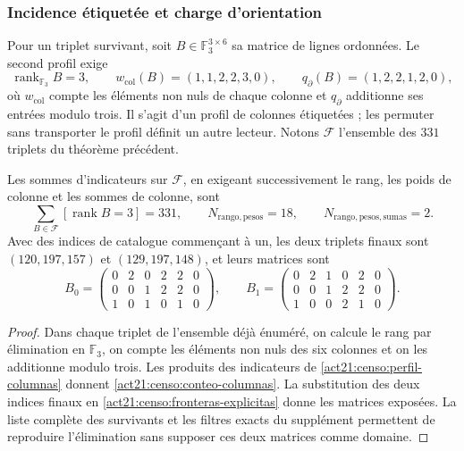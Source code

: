 \subsubsection{Incidence étiquetée et charge d'orientation}

Pour un triplet survivant, soit \(B\in\mathbb F_3^{3\times6}\) sa
matrice de lignes ordonnées. Le second profil exige
\begin{equation}
 \operatorname{rank}_{\mathbb F_3}B=3,\qquad
 w_{\mathrm{col}}(B)=(1,1,2,2,3,0),\qquad
 q_{\partial}(B)=(1,2,2,1,2,0),
 \label{act21:censo:perfil-columnas}
\end{equation}
où \(w_{\mathrm{col}}\) compte les éléments non nuls de chaque
colonne et \(q_{\partial}\) additionne ses entrées modulo trois. Il s'agit d'un profil
de colonnes étiquetées ; les permuter sans transporter le profil définit un autre
lecteur. Notons \(\mathcal F\) l'ensemble des \(331\) triplets
du théorème précédent.

\begin{proposition}
\label{act21:censo:dos-matrices}
Les sommes d'indicateurs sur \(\mathcal F\), en exigeant successivement
le rang, les poids de colonne et les sommes de colonne, sont
\begin{equation}
 \sum_{B\in\mathcal F}[\operatorname{rank}B=3]=331,
 \qquad N_{\mathrm{rango,pesos}}=18,
 \qquad N_{\mathrm{rango,pesos,sumas}}=2.
 \label{act21:censo:conteo-columnas}
\end{equation}
Avec des indices de catalogue commençant à un, les deux triplets finaux sont
\((120,197,157)\) et \((129,197,148)\), et leurs matrices sont
\[
 B_0=\begin{pmatrix}0&2&0&2&2&0\\0&0&1&2&2&0\\1&0&1&0&1&0\end{pmatrix},
 \qquad
 B_1=\begin{pmatrix}0&2&1&0&2&0\\0&0&1&2&2&0\\1&0&0&2&1&0\end{pmatrix}.
\]
\end{proposition}
\begin{proof}
Dans chaque triplet de l'ensemble déjà énuméré, on calcule le rang par élimination en \(\mathbb F_3\), on compte les éléments non nuls des six colonnes et on les additionne modulo trois. Les produits des indicateurs de \eqref{act21:censo:perfil-columnas} donnent \eqref{act21:censo:conteo-columnas}.
La substitution des deux indices finaux en
\eqref{act21:censo:fronteras-explicitas} donne les matrices exposées. La liste
complète des survivants et les filtres exacts du supplément permettent
de reproduire l'élimination sans supposer ces deux matrices comme domaine.
\end{proof}

